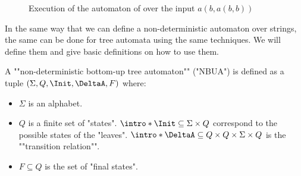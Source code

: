\documentclass[a4paper,UKenglish,cleveref, autoref, thm-restate]{lipics-v2021}
\begin{document}
\begin{figure}[h]\label{fig:count-leaves}
	\centering
	\caption{Execution of the automaton of  over the input $a(b,a(b,b))$}
\end{figure}


In the same way that we can define a non-deterministic automaton over strings, the same can be done for
tree automata using the same techniques. We will define them and give basic definitions on how to use them.

\begin{definition}
	\AP A ""non-deterministic bottom-up tree automaton"" (\reintro*"NBUA") is defined as a tuple
	$(\Sigma, Q, \Init, \DeltaA, F)$ where:
	\begin{itemize}
		\item $\Sigma$ is an alphabet.
		\item $Q$ is a finite set of "states".
		      \itemAP $\intro*\Init \subseteq \Sigma \times Q$ correspond to the possible states of the "leaves".
		      \itemAP $\intro*\DeltaA \subseteq Q \times Q \times \Sigma \times Q$ is the ""transition relation"".
		\item $F \subseteq Q$ is the set of "final states".
	\end{itemize}
\end{definition}
\end{document}
